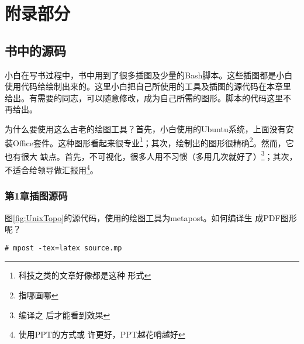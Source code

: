 \part{附录部分}
\chapter{书中的源码}
\label{chap:sourceCode}

小白在写书过程中，书中用到了很多插图及少量的Bash脚本。这些插图都是小白
使用代码给绘制出来的。这里小白把自己所使用的工具及插图的源代码在本章里
给出。有需要的同志，可以随意修改，成为自己所需的图形。脚本的代码这里不
再给出。

为什么要使用这么古老的绘图工具？首先，小白使用的Ubuntu系统，上面没有安
装Office套件。这种图形看起来很专业\footnote{科技之类的文章好像都是这种
  形式}；其次，绘制出的图形很精确\footnote{指哪画哪}。然而，它也有很大
缺点。首先，不可视化，很多人用不习惯（多用几次就好了）\footnote{编译之
  后才能看到效果}；其次，不适合给领导做汇报用\footnote{使用PPT的方式或
  许更好，PPT越花哨越好}。

\section{第1章插图源码}

图\ref{fig:UnixTopo}的源代码，使用的绘图工具为metapost。如何编译生
成PDF图形呢？

\begin{verbatim}
# mpost -tex=latex source.mp
\end{verbatim}

